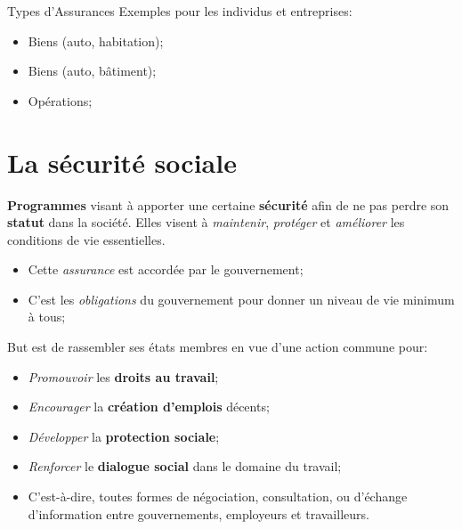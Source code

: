 \documentclass[10pt, french]{article}
\begin{document}
\begin{multicols*}{3}
\begin{conceptgen}{Types d'Assurances}
Exemples pour les \textcolor{amethyst}{individus} et \textcolor{amaranth}{entreprises}:
\begin{itemize}[leftmargin = *]
	\item	\textcolor{amethyst}{Biens (auto, habitation)};
	\item	\textcolor{amaranth}{Biens (auto, bâtiment)};
	\item	\textcolor{amaranth}{Opérations};
\end{itemize}
\end{conceptgen}


\section{La sécurité sociale}


\begin{definition}
\textbf{Programmes} visant à apporter une certaine \textbf{sécurité} afin de ne pas perdre son \textbf{statut} dans la société. Elles visent à \textit{maintenir}, \textit{protéger} et \textit{améliorer} les conditions de vie essentielles.

\begin{itemize}
	\item	Cette \og \textit{assurance} \fg{} est accordée par le gouvernement;
	\item	C'est les \textit{obligations} du gouvernement pour donner un niveau de vie minimum à tous;
\end{itemize}
\end{definition}


\begin{definition}
But est de rassembler ses états membres en vue d'une action commune pour:
\begin{itemize}
	\item	\textit{Promouvoir} les \textbf{droits au travail};
	\item	\textit{Encourager} la \textbf{création d'emplois} décents;
	\item	\textit{Développer} la \textbf{protection sociale};
	\item	\textit{Renforcer} le \textbf{dialogue social} dans le domaine du travail;
	\item[]	C'est-à-dire, toutes formes de négociation, consultation, ou d'échange d'information entre gouvernements, employeurs et travailleurs.
\end{itemize}


\end{definition}
\end{multicols*}
\end{document}
